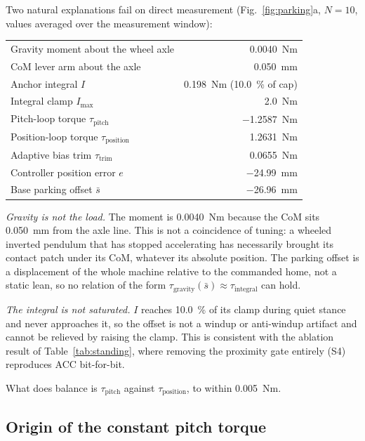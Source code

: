 \documentclass[a4paper,fleqn]{cas-dc}
\begin{document}
Two natural explanations fail on direct measurement (Fig.~\ref{fig:parking}a,
$N{=}10$, values averaged over the measurement window):

\begin{center}\footnotesize
\begin{tabular}{lr}
\hline
Gravity moment about the wheel axle & \SI{+0.0040}{Nm} \\
CoM lever arm about the axle & \SI{0.050}{mm} \\
Anchor integral $I$ & \SI{0.198}{Nm} (\SI{10.0}{\percent} of cap) \\
Integral clamp $I_{\max}$ & \SI{2.0}{Nm} \\
Pitch-loop torque $\tau_{\text{pitch}}$ & \SI{-1.2587}{Nm} \\
Position-loop torque $\tau_{\text{position}}$ & \SI{+1.2631}{Nm} \\
Adaptive bias trim $\tau_{\text{trim}}$ & \SI{+0.0655}{Nm} \\
Controller position error $e$ & \SI{-24.99}{mm} \\
Base parking offset $\bar{s}$ & \SI{-26.96}{mm} \\
\hline
\end{tabular}
\end{center}

\emph{Gravity is not the load.} The moment is \SI{0.0040}{Nm} because the CoM
sits \SI{0.050}{mm} from the axle line. This is not a coincidence of tuning: a
wheeled inverted pendulum that has stopped accelerating has necessarily brought
its contact patch under its CoM, whatever its absolute position. The parking
offset is a displacement of the whole machine relative to the commanded home,
not a static lean, so no relation of the form
$\tau_{\text{gravity}}(\bar{s})\approx\tau_{\text{integral}}$ can hold.

\emph{The integral is not saturated.} $I$ reaches \SI{10.0}{\percent} of its
clamp during quiet stance and never approaches it, so the offset is not a
windup or anti-windup artifact and cannot be relieved by raising the clamp.
This is consistent with the ablation result of Table~\ref{tab:standing}, where
removing the proximity gate entirely (S4) reproduces ACC bit-for-bit.

What does balance is $\tau_{\text{pitch}}$ against $\tau_{\text{position}}$,
to within \SI{0.005}{Nm}.

\subsection{Origin of the constant pitch torque}
\end{document}
